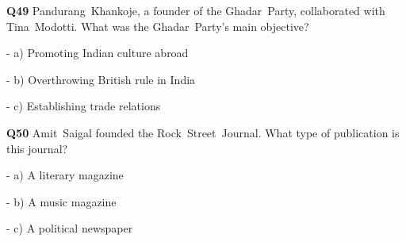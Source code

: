 \textbf{Q49} Pandurang Khankoje, a founder of the Ghadar Party, collaborated with Tina Modotti. What was the Ghadar Party's main objective?\par
\quad - a) Promoting Indian culture abroad\par
\quad - b) Overthrowing British rule in India\par
\quad - c) Establishing trade relations\par

\textbf{Q50} Amit Saigal founded the Rock Street Journal. What type of publication is this journal?\par
\quad - a) A literary magazine\par
\quad - b) A music magazine\par
\quad - c) A political newspaper\par